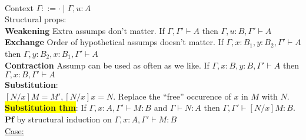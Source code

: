 %
% 
\\ Context $\Gamma ::= \cdot \mid \Gamma, u: A$
\\ Structural props:
\\ \textbf{Weakening} Extra assumps don't matter. If $\Gamma, \Gamma'
\vdash A$ then $\Gamma, u : B, \Gamma' \vdash A$
\\ \textbf{Exchange} Order of hypothetical assumps doesn't matter. If
$\Gamma, x : B_1, y:B_2, \Gamma' \vdash A$ then $\Gamma, y : B_2,
x:B_1, \Gamma' \vdash A$
\\ \textbf{Contraction} Assump can be used as often as we like. If
$\Gamma, x: B, y:B, \Gamma' \vdash A$ then $\Gamma, x : B, \Gamma'
\vdash A$
\\ \textbf{Substitution}: 
\\$[N/x]M = M', [N/x]x = N$. Replace the ``free'' occurence of $x$ in
$M$ with $N$.
\\ \colorbox{yellow}{\textbf{Substitution thm}}: If $\Gamma, x : A, \Gamma' \vdash M:B$ and
$\Gamma \vdash N:A$ then $\Gamma, \Gamma' \vdash [N/x]M:
B$. 
\\ \textbf{Pf}  by structural induction on $\Gamma, x : A, \Gamma'
\vdash M : B$
\\ \underline{Case:} 
